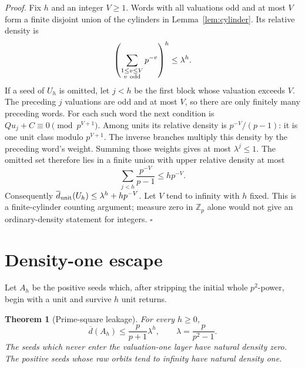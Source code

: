 \documentclass[11pt,letterpaper]{article}
\newcommand{\Z}{\mathbb{Z}}
\newtheorem{theorem}{Theorem}
\newenvironment{proof}{\noindent\textit{Proof.}}{\hfill\(\square\)}
\begin{document}
\begin{proof}
Fix \(h\) and an integer \(V\ge1\).
Words with all valuations odd and at most \(V\) form a finite disjoint union of the cylinders in Lemma~\ref{lem:cylinder}.
Its relative density is
\[
\left(\sum_{\substack{1\le v\le V\\v\ {\rm odd}}}p^{-v}\right)^h
\le\lambda^h.
\]
If a seed of \(U_h\) is omitted, let \(j<h\) be the first block whose valuation exceeds \(V\).
The preceding \(j\) valuations are odd and at most \(V\), so there are only finitely many preceding words.
For each such word the next condition is \(Qu_j+C\equiv0\pmod{p^{V+1}}\).
Among units its relative density is \(p^{-V}/(p-1)\): it is one unit class modulo \(p^{V+1}\).
The inverse branches multiply this density by the preceding word's weight.
Summing those weights gives at most \(\lambda^j\le1\).
The omitted set therefore lies in a finite union with upper relative density at most
\[
\sum_{j<h}\frac{p^{-V}}{p-1}\le h p^{-V}.
\]
Consequently \(\overline d_{\rm unit}(U_h)\le\lambda^h+h p^{-V}\).
Let \(V\) tend to infinity with \(h\) fixed.
This is a finite-cylinder counting argument; measure zero in \(\Z_p\) alone would not give an ordinary-density statement for integers.
\end{proof}

\section{Density-one escape}

Let \(A_h\) be the positive seeds which, after stripping the initial whole \(p^2\)-power, begin with a unit and survive \(h\) unit returns.

\begin{theorem}[Prime-square leakage]
\label{thm:escape}
For every \(h\ge0\),
\[
\overline d(A_h)\le \frac{p}{p+1}\lambda^h,
\qquad \lambda=\frac{p}{p^2-1}.
\]
The seeds which never enter the valuation-one layer have natural density zero.
The positive seeds whose raw orbits tend to infinity have natural density one.
\end{theorem}
\end{document}
